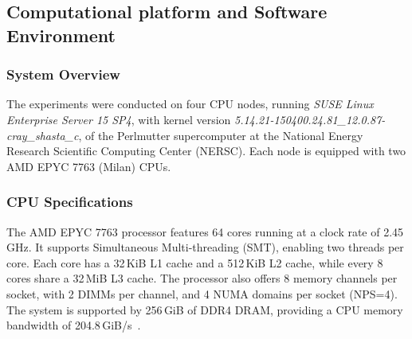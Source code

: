 \subsection{Computational platform and Software Environment}
\label{subsec:computational-platform-and-software-environment}







\subsubsection{System Overview}

The experiments were conducted on four CPU nodes, running \textit{SUSE Linux Enterprise Server 15 SP4}, with kernel version \textit{5.14.21-150400.24.81\_12.0.87-cray\_shasta\_c}, of the Perlmutter supercomputer at the National Energy Research Scientific Computing Center (NERSC). Each node is equipped with two AMD EPYC 7763 (Milan) CPUs.

\subsubsection{CPU Specifications}

The AMD EPYC 7763 processor features 64 cores running at a clock rate of 2.45\,GHz. It supports Simultaneous Multi-threading (SMT), enabling two threads per core. Each core has a 32\,KiB L1 cache and a 512\,KiB L2 cache, while every 8 cores share a 32\,MiB L3 cache. The processor also offers 8 memory channels per socket, with 2 DIMMs per channel, and 4 NUMA domains per socket (NPS=4). The system is supported by 256\,GiB of DDR4 DRAM, providing a CPU memory bandwidth of 204.8\,GiB/s~\cite{nersc_perlmutter_architecture, amd_epyc_tuning_guide}.

